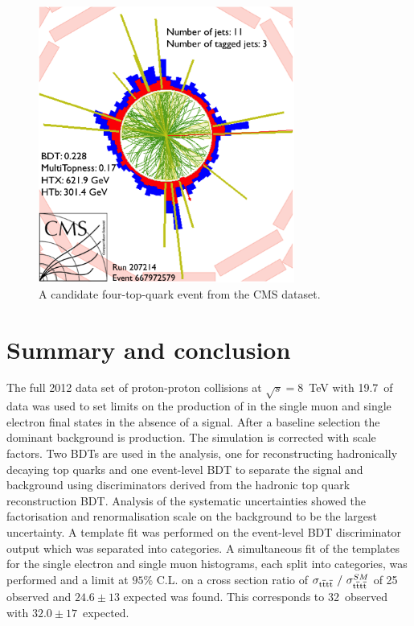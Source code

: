 \begin{figure}[ht!]
\centering
    \includegraphics[width=0.75\textwidth]{images/Run1/EventDisplay4topsDraft}
    \caption{A candidate four-top-quark event from the  CMS dataset.}
    \label{fig:fourtopevent}
\end{figure}
\section{Summary and conclusion}
\label{sec:summary8}
The full 2012 data set of proton-proton collisions at $\sqrt{s}=8$~TeV with 19.7~\fbinv of data was used to set limits on the production of \tttt in the single muon and single electron final states in the absence of a signal. After a baseline selection the dominant background is \ttbar production. The simulation is corrected with scale factors. Two BDTs are used in the analysis, one for reconstructing hadronically decaying top quarks and one event-level BDT to separate the signal and background using discriminators derived from the hadronic top quark reconstruction BDT. Analysis of the systematic uncertainties showed the factorisation and renormalisation scale on the \ttbar background to be the largest uncertainty. A template fit was performed on the event-level BDT discriminator output which was separated into \njets categories. A simultaneous fit of the templates for the single electron and single muon histograms, each split into \njets categories, was performed and a \CLS limit at $95\%$ C.L. on a cross section ratio of $\sigma_{{\mathrm{t}\overline{\mathrm{t}}\mathrm{t}\overline{\mathrm{t}}}}~/~\sigma_{{\mathrm{t}\overline{\mathrm{t}}\mathrm{t}\overline{\mathrm{t}}}}^{SM} $ of 25 observed and $24.6\pm13$ expected was found. This corresponds to 32~\fb observed with $32.0\pm17$~\fb expected.

